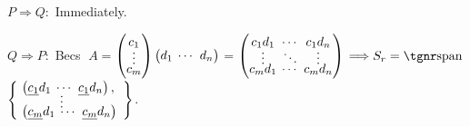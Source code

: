 \par\quad
\!\par\quad
$P\Rightarrow Q:$ \;Immediately.\par\vspace{-12pt}\quad
$Q\Rightarrow P:$ \;Becs $\;A={}${\normalsize$\begin{pmatrix}c_1 \\[-4pt] \vdots \\[-5pt] c_m \end{pmatrix}\begin{pmatrix}d_1 & \hspace{-6pt}\cdots & \hspace{-6pt}d_n\end{pmatrix}$}${}={}${\normalsize$\begin{pmatrix} c_1 d_1 & \hspace{-6pt}\cdots & \hspace{-6pt}c_1 d_n\\[-4pt] \vdots & \hspace{-6pt}\ddots & \hspace{-6pt}\vdots \\[-5pt] c_m d_1 & \hspace{-6pt}\cdots & \hspace{-6pt}c_m d_n \end{pmatrix}$} $\Longrightarrow S_r=\Spn${\FontSmall$\MathLeftrightBrace{l}{
	\!\begin{pmatrix}\uline{c_1} d_1 & \hspace{-6pt}\cdots & \hspace{-6pt}\uline{c_1} d_n\end{pmatrix},\\[-6pt] \;\;\;\qquad\vdots\\[-6pt]
	\!\begin{pmatrix}\uline{c_m} d_1 & \hspace{-6pt}\cdots & \hspace{-6pt}\uline{c_m} d_n\end{pmatrix}
}%
$}.\par\vspace{0pt}\quad
